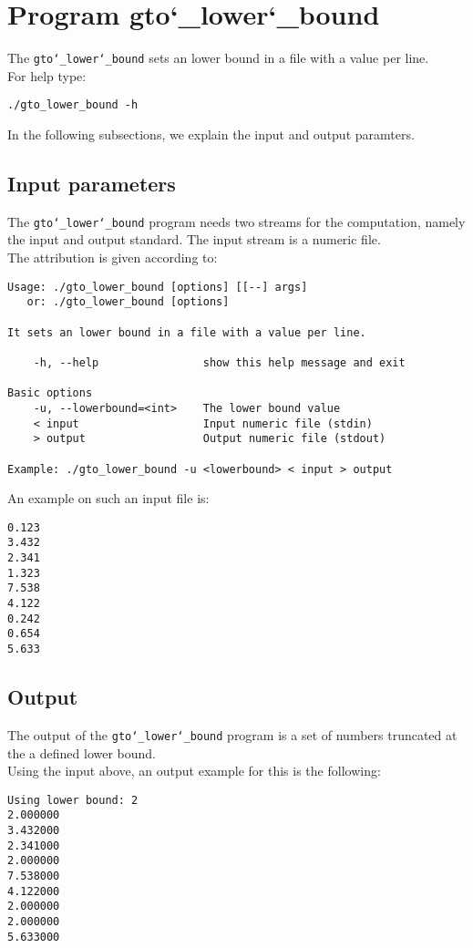 \section{Program gto\char`_lower\char`_bound}
The \texttt{gto\char`_lower\char`_bound} sets an lower bound in a file with a value per line.\\
For help type:
\begin{lstlisting}
./gto_lower_bound -h
\end{lstlisting}
In the following subsections, we explain the input and output paramters.

\subsection*{Input parameters}

The \texttt{gto\char`_lower\char`_bound} program needs two streams for the computation, namely the input and output standard. The input stream is a numeric file.\\
The attribution is given according to:
\begin{lstlisting}
Usage: ./gto_lower_bound [options] [[--] args]
   or: ./gto_lower_bound [options]

It sets an lower bound in a file with a value per line.

    -h, --help                show this help message and exit

Basic options
    -u, --lowerbound=<int>    The lower bound value
    < input                   Input numeric file (stdin)
    > output                  Output numeric file (stdout)

Example: ./gto_lower_bound -u <lowerbound> < input > output
\end{lstlisting}
An example on such an input file is:
\begin{lstlisting}
0.123
3.432
2.341
1.323
7.538
4.122
0.242
0.654
5.633
\end{lstlisting}

\subsection*{Output}
The output of the \texttt{gto\char`_lower\char`_bound} program is a set of numbers truncated at the a defined lower bound.\\
Using the input above, an output example for this is the following:
\begin{lstlisting}
Using lower bound: 2
2.000000
3.432000
2.341000
2.000000
7.538000
4.122000
2.000000
2.000000
5.633000
\end{lstlisting}